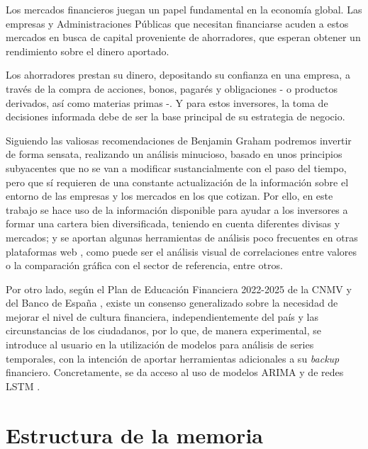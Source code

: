 
Los mercados financieros juegan un papel fundamental en la economía global. 
Las empresas y Administraciones Públicas que necesitan financiarse acuden a 
estos mercados en busca de capital proveniente de ahorradores, que esperan 
obtener un rendimiento sobre el dinero aportado. 

Los ahorradores prestan su dinero, depositando su confianza en una empresa,
 a través de la compra de acciones, bonos, pagarés y obligaciones - o productos
 derivados, así como materias primas -. Y para estos inversores, la toma de 
 decisiones informada debe de ser la base principal de su estrategia de negocio. 

Siguiendo las valiosas recomendaciones de Benjamin Graham \citep{book:Inversor_inteligente}
 podremos invertir de forma sensata, realizando un análisis minucioso, basado 
 en unos principios subyacentes que no se van a modificar sustancialmente con 
 el paso del tiempo, pero que sí requieren de una constante actualización de 
 la información sobre el entorno de las empresas y los mercados en los que 
 cotizan. Por ello, en este trabajo se hace uso de la información disponible 
 para ayudar a los inversores a formar una cartera bien diversificada, teniendo 
 en cuenta diferentes divisas y mercados; y se aportan algunas herramientas de 
 análisis poco frecuentes en otras plataformas web \citep{online:MarketScreener,online:Investing,online:Bloomberg}, 
 como puede ser el análisis visual de correlaciones entre valores o la 
 comparación gráfica con el sector de referencia, entre otros. 
 
Por otro lado, según el Plan de Educación Financiera 2022-2025 \citep{report:cnmv_informe} 
 de la CNMV \citep{online:cnmv_portal} y del Banco de España \citep{online:bde}, existe un consenso 
 generalizado sobre la necesidad de mejorar el nivel de cultura financiera, 
 independientemente del país y las circunstancias de los ciudadanos, por lo que, de 
 manera experimental, se introduce al usuario en la utilización de modelos para análisis 
 de series temporales, con la intención de aportar herramientas adicionales a su \textit{backup} 
 financiero. Concretamente, se da acceso al uso de modelos ARIMA \citep{wiki:ARIMA} 
 y de redes LSTM \citep{10.1162/neco.1997.9.8.1735}. 


\section{Estructura de la memoria}\label{estructura-de-la-memoria}

